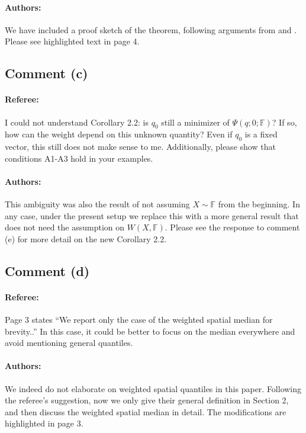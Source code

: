 \documentclass[11pt,letterpaper]{article}
\newcommand{\BF}{{\mathbb{F}}}
\theoremstyle{definition} \newtheorem{Definition}[Theorem]{Definition}
\begin{document}
\paragraph{Authors:}
We have included a proof sketch of the theorem, following arguments from \cite{ref:AoS921514_Niemiro} and \cite{ref:AoS891631_Haberman}. Please see highlighted text in page 4.

\subsection*{Comment (c)}
\paragraph{Referee:}
I could not understand Corollary 2.2: is $q_0$ still a minimizer of $\Psi(q; 0; \BF)$? If so, how can the weight depend on this unknown quantity? Even if $q_0$ is a fixed vector, this still does not make sense to me. Additionally, please show that conditions A1-A3 hold in your examples.

\paragraph{Authors:}
This ambiguity was also the result of not assuming $X \sim \BF$ from the beginning. In any case, under the present setup we replace this with a more general result that does not need the assumption on $W(X,\BF)$. Please see the response to comment (e) for more detail on the new Corollary 2.2.

\subsection*{Comment (d)}
\paragraph{Referee:}
Page 3 states “We report only the case of the weighted spatial median for brevity..” In this case, it could be better to focus on the median everywhere and avoid mentioning general quantiles.

\paragraph{Authors:}
We indeed do not elaborate on weighted spatial quantiles in this paper. Following the referee's suggestion, now we only give their general definition in Section 2, and then discuss the weighted spatial median in detail. The modifications are highlighted in page 3.
\end{document}
